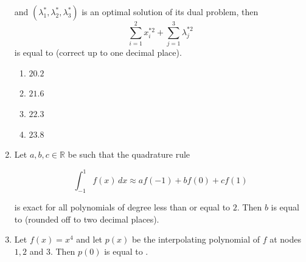 \documentclass[journal,12pt,onecolumn]{IEEEtran}
\theoremstyle{remark}
\begin{document}
\begin{enumerate}[start=1, label=Q.\arabic*]
and $(\lambda_1^*, \lambda_2^*, \lambda_3^*)$ is an optimal solution of its dual problem, then  
\[
\sum_{i=1}^2 x_i^{*2} + \sum_{j=1}^3 \lambda_j^{*2}
\]
is equal to \underline{\hspace{2cm}} (correct up to one decimal place).

\begin{enumerate}
\item $20.2$
\item $21.6$
\item $22.3$
\item $23.8$
\end{enumerate}

\hfill{}

\item Let $a, b, c \in \mathbb{R}$ be such that the quadrature rule  

\[
\int_{-1}^1 f(x) \, dx \approx af(-1) + bf(0) + cf(1)
\]

is exact for all polynomials of degree less than or equal to $2$. Then $b$ is equal to \underline{\hspace{2cm}} (rounded off to two decimal places).

\begin{enumerate}
\end{enumerate}

\hfill{}

\item Let $f(x) = x^4$ and let $p(x)$ be the interpolating polynomial of $f$ at nodes $1,2$ and $3$. Then $p(0)$ is equal to \underline{\hspace{2cm}}.

\begin{enumerate}
\end{enumerate}

\hfill{}


\end{enumerate}
\end{document}
